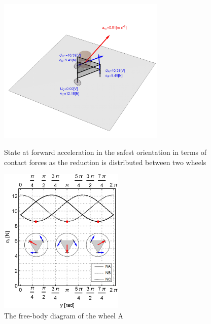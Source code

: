 \documentclass[12pt,english,twoside]{article}
\begin{document}
\begin{figure}[htb!]
	\centering
	\includegraphics[height=7cm]{figures/accelerationState}
	\caption{State at forward acceleration in the safest orientation in terms of contact forces as the reduction is distributed between two wheels}
	\label{accelerationState}
	\endminipage\hfill
	\centering
	\includegraphics[height=7cm]{figures/dangerousOri.png}
	\caption{The free-body diagram of the wheel A}
	\label{dangerousOri}
	\endminipage\hfill
\end{figure}
\end{document}
